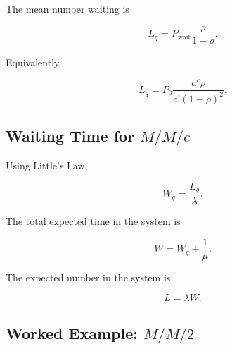 The mean number waiting is

\[
\boxed{
L_q
=
P_{\mathrm{wait}}
\frac{
\rho
}{
1-\rho
}.
}
\]

Equivalently,

\[
\boxed{
L_q
=
P_0
\frac{
a^c\rho
}{
c!(1-\rho)^2
}.
}
\]

\subsection{Waiting Time for \(M/M/c\)}
\label{subsec:mmc-Wq}

Using Little's Law,

\[
\boxed{
W_q
=
\frac{
L_q
}{
\lambda
}.
}
\]

The total expected time in the system is

\[
\boxed{
W
=
W_q
+
\frac1\mu.
}
\]

The expected number in the system is

\[
\boxed{
L
=
\lambda W.
}
\]

\subsection{Worked Example: \(M/M/2\)}
\label{subsec:worked-mm2}

